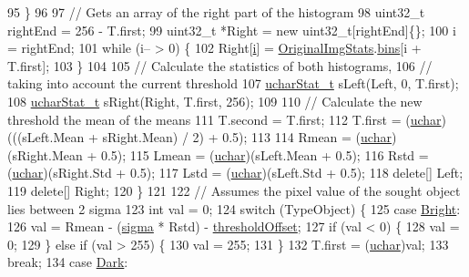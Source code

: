 \begin{DoxyCode}
95     \}
96 
97     \textcolor{comment}{// Gets an array of the right part of the histogram}
98     uint32\_t rightEnd = 256 - T.first;
99     uint32\_t *Right = \textcolor{keyword}{new} uint32\_t[rightEnd]\{\};
100     i = rightEnd;
101     \textcolor{keywordflow}{while} (i-- > 0) \{
102       Right[\hyperlink{_comparision_pictures_2_createtest_image_8m_a6f6ccfcf58b31cb6412107d9d5281426}{i}] = \hyperlink{class_vision_1_1_segment_ab35cfe5504de7e5ea327991468e6cf3b}{OriginalImgStats}.\hyperlink{class_soil_math_1_1_stats_a00778b298b1ebb335eb0c4eed69e471c}{bins}[i + T.first];
103     \}
104 
105     \textcolor{comment}{// Calculate the statistics of both histograms,}
106     \textcolor{comment}{// taking into account the current threshold}
107     \hyperlink{class_soil_math_1_1_stats}{ucharStat\_t} sLeft(Left, 0, T.first);
108     \hyperlink{class_soil_math_1_1_stats}{ucharStat\_t} sRight(Right, T.first, 256);
109 
110     \textcolor{comment}{// Calculate the new threshold the mean of the means}
111     T.second = T.first;
112     T.first = (\hyperlink{_soil_math_types_8h_a65f85814a8290f9797005d3b28e7e5fc}{uchar})(((sLeft.Mean + sRight.Mean) / 2) + 0.5);
113 
114     Rmean = (\hyperlink{_soil_math_types_8h_a65f85814a8290f9797005d3b28e7e5fc}{uchar})(sRight.Mean + 0.5);
115     Lmean = (\hyperlink{_soil_math_types_8h_a65f85814a8290f9797005d3b28e7e5fc}{uchar})(sLeft.Mean + 0.5);
116     Rstd = (\hyperlink{_soil_math_types_8h_a65f85814a8290f9797005d3b28e7e5fc}{uchar})(sRight.Std + 0.5);
117     Lstd = (\hyperlink{_soil_math_types_8h_a65f85814a8290f9797005d3b28e7e5fc}{uchar})(sLeft.Std + 0.5);
118     \textcolor{keyword}{delete}[] Left;
119     \textcolor{keyword}{delete}[] Right;
120   \}
121 
122   \textcolor{comment}{// Assumes the pixel value of the sought object lies between 2 sigma}
123   \textcolor{keywordtype}{int} val = 0;
124   \textcolor{keywordflow}{switch} (TypeObject) \{
125   \textcolor{keywordflow}{case} \hyperlink{class_vision_1_1_segment_ac3ddf2c72ee6333007510b680db1e7ddad37a09a08a5a4fdf88cb15f21e5ff28b}{Bright}:
126     val = Rmean - (\hyperlink{class_vision_1_1_segment_a0d2c607a6064d8d8fea925fc7bfbbc53}{sigma} * Rstd) - \hyperlink{class_vision_1_1_segment_a1338fc42ead26c6b1dd661f4281f5674}{thresholdOffset};
127     \textcolor{keywordflow}{if} (val < 0) \{
128       val = 0;
129     \} \textcolor{keywordflow}{else} \textcolor{keywordflow}{if} (val > 255) \{
130       val = 255;
131     \}
132     T.first = (\hyperlink{_soil_math_types_8h_a65f85814a8290f9797005d3b28e7e5fc}{uchar})val;
133     \textcolor{keywordflow}{break};
134   \textcolor{keywordflow}{case} \hyperlink{class_vision_1_1_segment_ac3ddf2c72ee6333007510b680db1e7dda962a0c0955809f63df036dbd41824c54}{Dark}:

\end{DoxyCode}
